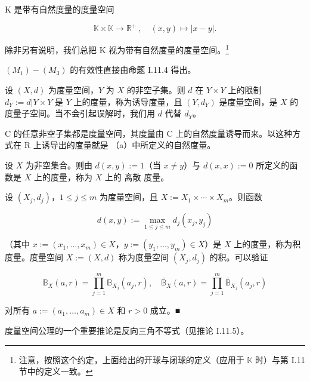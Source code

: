 \begin{example}

\begin{items}
\item

K 是带有自然度量的度量空间

\[
\mathbb{K}\times\mathbb{K}\to\mathbb{R}^{+}~,\quad(x,y)\mapsto\left|x-y\right|.
\]

除非另有说明，我们总把 K 视为带有自然度量的度量空间。\footnote{注意，按照这个约定，上面给出的开球与闭球的定义（应用于 $\mathbb K$ 时）与第 I.11 节中的定义一致。}

\proofhead
$ (M_{1})-(M_{3}) $ 的有效性直接由命题 I.11.4 得出。
\item

设 $(X,d)$ 为度量空间，$Y$ 为 $X$ 的非空子集。则 $d$ 在 $Y\times Y$ 上的限制 $d_{Y}:=d|Y\times Y$ 是 $Y$ 上的度量，称为诱导度量，且 $(Y,d_{Y})$ 是度量空间，是 $X$ 的度量子空间。当不会引起误解时，我们用 $d$ 代替 $d_{Y}$。

\item

C 的任意非空子集都是度量空间，其度量由 C 上的自然度量诱导而来。以这种方式在 R 上诱导出的度量就是 （a）中所定义的自然度量。

\item

设 $X$ 为非空集合。则由 $d(x,y):=1$（当 $x\neq y$）与 $d(x,x):=0$ 所定义的函数是 $X$ 上的度量，称为 $X$ 上的 $\text{离散}$ 度量。

\item

设  $ (X_j, d_j) $，$ 1 \leq j \leq m $ 为度量空间，且  $ X := X_1 \times \cdots \times X_m $。则函数

\[
d(x,y):=\max_{1\leq j\leq m}d_{j}(x_{j},y_{j})
\]

（其中 $x := (x_1, \ldots, x_m) \in X$，$y := (y_1, \ldots, y_m) \in X$）是 $X$ 上的度量，称为积度量。度量空间 $X := (X, d)$ 称为度量空间 $(X_j, d_j)$ 的积。可以验证

\[
\mathbb{B}_{X}(a,r)=\prod_{j=1}^{m}\mathbb{B}_{X_{j}}(a_{j},r),\quad\bar{\mathbb{B}}_{X}(a,r)=\prod_{j=1}^{m}\bar{\mathbb{B}}_{X_{j}}(a_{j},r)
\]

对所有  $ a := (a_1, \ldots, a_m) \in X $ 和  $ r > 0 $ 成立。■

\end{items}

度量空间公理的一个重要推论是反向三角不等式（见推论 I.11.5）。

\end{example}

